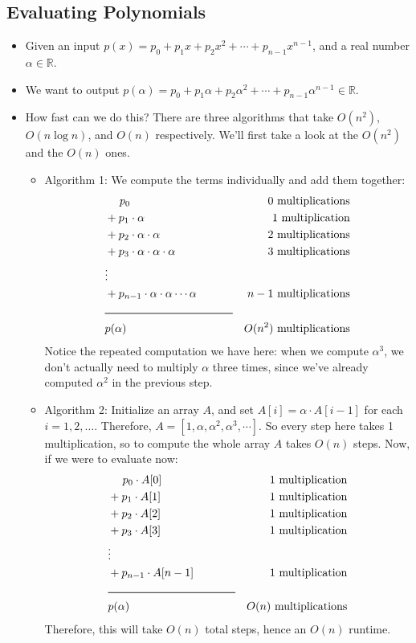 \subsection{Evaluating Polynomials}
\begin{itemize}
	\item Given an input \( p(x) = p_0 + p_1x + p_2x^2 + \cdots + p_{n-1}x^{n-1} \), and a real number \( \alpha \in \mathbb R \). 
	\item We want to output \( p(\alpha) = p_0 + p_1\alpha + p_2\alpha^2 + \cdots + p_{n-1}\alpha ^{n-1} \in \mathbb R \). 
	\item How fast can we do this? There are three algorithms that take \( O(n^2) \), \( O(n \log n) \), and \( O(n) \) 
		respectively. We'll first take a look at the \( O(n^2) \) and the \( O(n) \) ones. 
		\begin{itemize}
			\item Algorithm 1: We compute the terms individually and add them together: 
				\begin{align*}
					&\phantom{+a} p_0 & \text{0 multiplications}\\
					&+ p_1 \cdot \alpha & \text{1 multiplication}\\
					&+ p_2 \cdot \alpha \cdot \alpha & \text{2 multiplications}\\
					&+ p_3 \cdot \alpha \cdot \alpha \cdot \alpha & \text{3 multiplications}\\
					&\vdots\\
					&+ p_{n-1} \cdot \alpha \cdot \alpha \cdots \alpha & \text{\( n-1 \) multiplications}\\
					&\rule{4cm}{0.6pt}&\\
					&p(\alpha) & \text{\( O(n^2) \) multiplications}
				\end{align*}
			Notice the repeated computation we have here: when we compute \( \alpha^3 \), we don't actually need to multiply
				\( \alpha \) three times, since we've already computed \( \alpha^2 \) in the previous step. 
			\item Algorithm 2: Initialize an array \( A \), and set \( A[i] = \alpha \cdot A[i-1] \) for each 
				\( i = 1, 2, \dots \). Therefore,  \( A = [1, \alpha, \alpha^2 , \alpha^3, \cdots] \). So every step here 
				takes 1 multiplication, so to compute the whole array \( A \) takes \( O(n) \) steps. Now, if we were to evaluate 
				now:
				\begin{align*}
					&\phantom{+a} p_0 \cdot A[0]& \text{1 multiplication}\\
					&+ p_1 \cdot A[1]& \text{1 multiplication}\\
					&+ p_2 \cdot A[2] & \text{1 multiplication}\\
					&+ p_3 \cdot A[3] & \text{1 multiplication}\\
					&\vdots\\
					&+ p_{n-1} \cdot A[n-1]& \text{1 multiplication}\\
					&\rule{4cm}{0.6pt}&\\
					&p(\alpha) & \text{\( O(n) \) multiplications}
				\end{align*}
				Therefore, this will take \( O(n) \) total steps, hence an \( O(n) \) runtime.  


\end{itemize}
\end{itemize}
